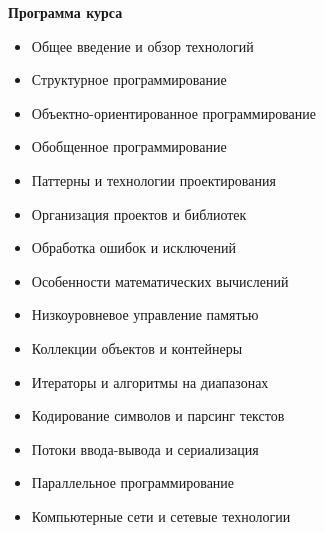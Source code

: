 \documentclass{beamer} %
\begin{document}
\begin{frame}{\bf Программа курса}

{\footnotesize

    \begin{itemize}

        \setlength\itemsep{0.1em}

        \item Общее введение и обзор технологий

        \item Структурное программирование

        \item Объектно-ориентированное программирование

        \item Обобщенное программирование

        \item Паттерны и технологии проектирования

        \item Организация проектов и библиотек

        \item Обработка ошибок и исключений

        \item Особенности математических вычислений

        \item Низкоуровневое управление памятью

        \item Коллекции объектов и контейнеры

        \item Итераторы и алгоритмы на диапазонах

        \item Кодирование символов и парсинг текстов

        \item Потоки ввода-вывода и сериализация

        \item Параллельное программирование

        \item Компьютерные сети и сетевые технологии
        
    \end{itemize}
    
}

\end{frame}
\end{document}
